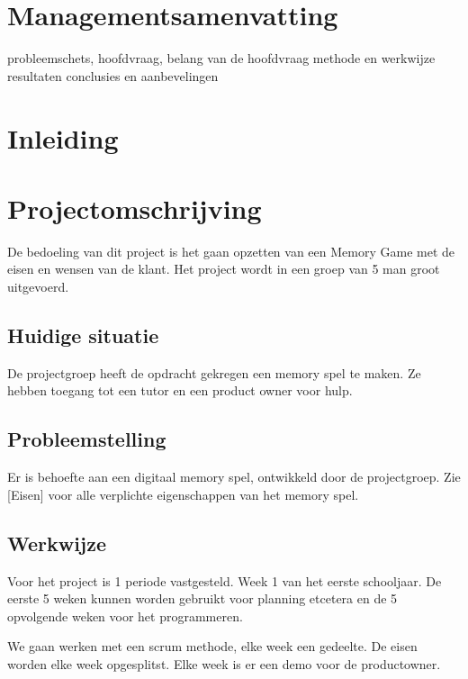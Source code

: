 \message{ !name(Document.tex)}\documentclass[a4paper,titlepage,11pt]{article}
\begin{document}
\clearpage

\section{Managementsamenvatting}

probleemschets, hoofdvraag, belang van de hoofdvraag
methode en werkwijze
resultaten
conclusies en aanbevelingen

\clearpage

\section{Inleiding}

\clearpage

\section{Projectomschrijving}

De bedoeling van dit project is het gaan opzetten van een Memory Game met de eisen en wensen van de klant. Het project wordt in een groep van 5 man groot uitgevoerd.

\subsection{Huidige situatie}

De projectgroep heeft de opdracht gekregen een memory spel te maken. Ze hebben toegang tot een tutor en een product owner voor hulp.

\subsection{Probleemstelling}

Er is behoefte aan een digitaal memory spel, ontwikkeld door de projectgroep. Zie [Eisen] voor alle verplichte eigenschappen van het memory spel.

\subsection{Werkwijze}

Voor het project is 1 periode vastgesteld. Week 1 van het eerste schooljaar. De eerste 5 weken kunnen worden gebruikt voor planning etcetera en de 5 opvolgende weken voor het programmeren.

We gaan werken met een scrum methode, elke week een gedeelte. De eisen worden elke week opgesplitst. Elke week is er een demo voor de productowner.
\end{document}
